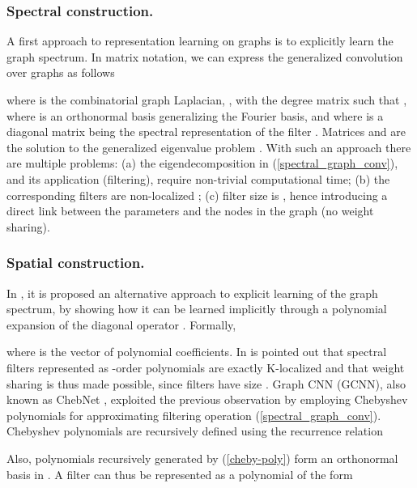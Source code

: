 \documentclass[runningheads]{llncs}
\begin{document}
\subsubsection{Spectral construction.}
A first approach to representation learning on graphs is to explicitly learn the graph spectrum. In matrix notation, we can express the
generalized convolution over graphs as follows \cite{DBLP:journals/corr/BronsteinBLSV16}

where  is the combinatorial graph Laplacian, , with  the degree matrix such that , where  is an orthonormal basis generalizing the Fourier basis, and where  is a diagonal matrix being the spectral representation of the filter \cite{Belkin:2001:LES:2980539.2980616,bruna}. Matrices  and  are the solution to the generalized eigenvalue problem  \cite{Belkin:2001:LES:2980539.2980616,bruna}.
With such an approach there are multiple problems: (a) the eigendecomposition in (\ref{spectral_graph_conv}), and its application (filtering), require non-trivial computational time; (b) the corresponding filters are non-localized \cite{DBLP:journals/corr/DefferrardBV16}; (c) filter size is , hence introducing a direct link between the parameters and the  nodes in the graph (no weight sharing).

\subsubsection{Spatial construction.}
In \cite{DBLP:journals/corr/DefferrardBV16}, it is proposed an alternative approach to explicit learning of the graph spectrum, by showing how it can be learned implicitly through a polynomial expansion of the diagonal operator . Formally,

where  is the vector of polynomial coefficients. In \cite{DBLP:journals/corr/DefferrardBV16} is pointed out that spectral filters represented as -order polynomials are exactly K-localized and that weight sharing is thus made possible, since filters have size . Graph CNN (GCNN), also known as ChebNet \cite{DBLP:journals/corr/DefferrardBV16}, exploited the previous observation by employing Chebyshev polynomials for approximating filtering operation (\ref{spectral_graph_conv}). Chebyshev polynomials are recursively defined using the recurrence relation

Also, polynomials recursively generated by (\ref{cheby-poly}) form an orthonormal basis in  \cite{DBLP:journals/corr/BronsteinBLSV16,DBLP:journals/corr/DefferrardBV16}. A filter can thus be represented as a polynomial of the form
\end{document}
